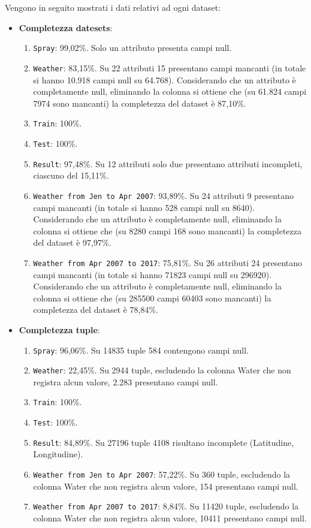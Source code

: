 Vengono in seguito mostrati i dati relativi ad ogni dataset:
\begin{itemize}
	\item \textbf{Completezza datesets}:
		\begin{enumerate}
			\item \texttt{Spray}: 99,02\%. Solo un attributo presenta campi null.
			\item \texttt{Weather}: 83,15\%. Su 22 attributi 15 presentano campi mancanti (in totale si hanno 10.918 campi null su 64.768). Considerando che un attributo è completamente null, eliminando la colonna si ottiene che (su 61.824 campi 7974 sono mancanti) la completezza del dataset è 87,10\%.
			\item \texttt{Train}: 100\%.
			\item \texttt{Test}: 100\%.
			\item \texttt{Result}: 97,48\%. Su 12 attributi solo due presentano attributi incompleti, ciascuno del 15,11\%.
			\item \texttt{Weather from Jen to Apr 2007}: 93,89\%. Su 24 attributi 9 presentano campi mancanti (in totale si hanno 528 campi null su 8640). Considerando che un attributo è completamente null, eliminando la colonna si ottiene che (su 8280 campi 168 sono mancanti) la completezza del dataset è 97,97\%.
			\item \texttt{Weather from Apr 2007 to 2017}: 75,81\%. Su 26 attributi 24 presentano campi mancanti (in totale si hanno 71823 campi null su 296920). Considerando che un attributo è completamente null, eliminando la colonna si ottiene che (su 285500 campi 60403 sono mancanti) la completezza del dataset è 78,84\%.
		\end{enumerate}
	
	\item \textbf{Completezza tuple}:
		\begin{enumerate}
			\item \texttt{Spray}: 96,06\%. Su 14835 tuple 584 contengono campi null.
			\item \texttt{Weather}: 22,45\%. Su 2944 tuple, escludendo la colonna Water che non registra alcun valore, 2.283 presentano campi null.
			\item \texttt{Train}: 100\%.
			\item \texttt{Test}: 100\%.
			\item \texttt{Result}: 84,89\%. Su 27196 tuple 4108 risultano incomplete (Latitudine, Longitudine).
			\item \texttt{Weather from Jen to Apr 2007}: 57,22\%. Su 360 tuple, escludendo la colonna Water che non registra alcun valore, 154 presentano campi null.
			\item \texttt{Weather from Apr 2007 to 2017}: 8,84\%. Su 11420 tuple, escludendo la colonna Water che non registra alcun valore, 10411 presentano campi null.
		\end{enumerate}
\end{itemize}

